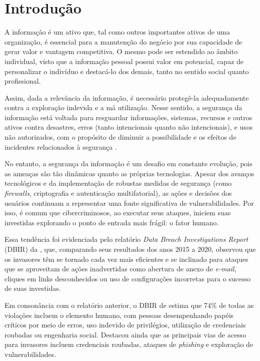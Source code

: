 \documentclass[portuguese]{textolivre}
\begin{document}
\begin{polyabstract}
\begin{english}
\begin{abstract}
\end{abstract}
\end{english}
\end{polyabstract}

\section{Introdução}
A informação é um ativo que, tal como outros importantes ativos de uma organização, é essencial para a manutenção do negócio por sua capacidade de gerar valor e vantagem competitiva. O mesmo pode ser estendido ao âmbito individual, visto que a informação pessoal possui valor em potencial, capaz de personalizar o indivíduo e destacá-lo dos demais, tanto no sentido social quanto profissional.

Assim, dada a relevância da informação, é necessário protegê-la adequadamente contra a exploração indevida e a má utilização. Nesse sentido, a segurança da informação está voltada para resguardar informações, sistemas, recursos e outros ativos contra desastres, erros (tanto intencionais quanto não intencionais), e usos não autorizados, com o propósito de diminuir a possibilidade e os efeitos de incidentes relacionados à segurança \cite{coelho_gestao_2014}.

No entanto, a segurança da informação é um desafio em constante evolução, pois as ameaças são tão dinâmicas quanto as próprias tecnologias. Apesar dos avanços tecnológicos e da implementação de robustas medidas de segurança (como \textit{firewalls}, criptografia e autenticação multifatorial), as ações e decisões dos usuários continuam a representar uma fonte significativa de vulnerabilidades. Por isso, é comum que cibercriminosos, ao executar seus ataques, iniciem suas investidas explorando o ponto de entrada mais frágil: o fator humano.

Essa tendência foi evidenciada pelo relatório \textit{Data Breach Investigations Report} (DBIR) da \textcite{verizon_data_2020}, que, comparando seus resultados dos anos 2015 a 2020, observou que os invasores têm se tornado cada vez mais eficientes e se inclinado para ataques que se aproveitam de ações inadvertidas como abertura de anexo de \textit{e-mail}, cliques em links desconhecidos ou uso de configurações incorretas para o sucesso de suas investidas.

Em consonância com o relatório anterior, o DBIR de \textcite{verizon_data_2023} estima que 74\% de todas as violações incluem o elemento humano, com pessoas desempenhando papéis críticos por meio de erros, uso indevido de privilégios, utilização de credenciais roubadas ou engenharia social. Destacou ainda que as principais vias de acesso para invasores incluem credenciais roubadas, ataques de \textit{phishing} e exploração de vulnerabilidades.
\end{document}
